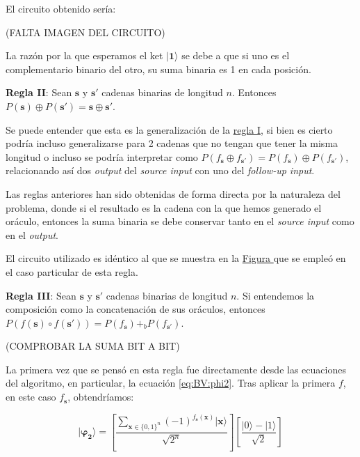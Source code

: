 El circuito obtenido sería: \newline

 (FALTA IMAGEN DEL CIRCUITO)\newline

La razón por la que esperamos el ket $|\mathbf{1}\rangle$ se debe a que si uno es el complementario binario del otro, su suma binaria es 1 en cada posición.\newline

\textbf{Regla II}: Sean $\mathbf{s}$ y $\mathbf{s}'$ cadenas binarias de longitud $n$. Entonces $P(\mathbf{s})\oplus P(\mathbf{s}')=\mathbf{s} \oplus \mathbf{s}'$.\newline

 Se puede entender que esta es la generalización de la \hyperref[R:BV:1]{regla I}, si bien es cierto podría incluso generalizarse para 2 cadenas que no tengan que tener la misma longitud o incluso se podría interpretar como $P(f_{\mathbf{s}
}\oplus f_{\mathbf{s}'})=P(f_{\mathbf{s}})\oplus P(f_{\mathbf{s}'})$, relacionando así dos \textit{output} del \textit{source input} con uno del \textit{follow-up input}.\newline

 Las reglas anteriores han sido obtenidas de forma directa por la naturaleza del problema, donde si el resultado es la cadena con la que hemos generado el oráculo, entonces la suma binaria se debe conservar tanto en el \textit{source input} como en el \textit{output}.\newline

 El circuito utilizado es idéntico al que se muestra en la \hyperref[Fig:BVRule1]{Figura } que se empleó en el caso particular de esta regla. \newline

 \textbf{Regla III}\label{RIII:BV}: Sean $\mathbf{s}$ y $\mathbf{s}'$ cadenas binarias de longitud $n$. Si entendemos la composición como la concatenación de sus oráculos, entonces $P(f(\mathbf{s}) \circ f(\mathbf{s}'))= P(f_{\mathbf{s}}) +_{b} P(f_{\mathbf{s}'})$.\newline

 (COMPROBAR LA SUMA BIT A BIT)

 La primera vez que se pensó en esta regla fue directamente desde las ecuaciones del algoritmo, en particular, la ecuación \ref{eq:BV:phi2}. Tras aplicar la primera $f$, en este caso $f_{\mathbf{s}}$, obtendríamos:

 \begin{equation} 
    \mathbf{|\varphi_{2}\rangle} =\left[ \dfrac{\sum_{\mathbf{x} \in \{0,1\}^{n}}(-1)^{f_{\mathbf{s}}(\mathbf{x})}|\mathbf{x}\rangle}{\sqrt{2^{n}}}\right] \left[ \dfrac{|0\rangle - |1\rangle}{\sqrt{2}}\right]\end{equation}\newline

